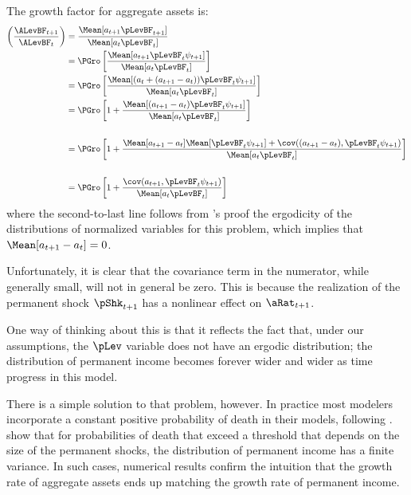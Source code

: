 \documentclass[./BufferStockTheory.tex]{subfiles}
\begin{document}
{The growth factor for aggregate assets is:
\begin{align*}
\left(\frac{\ALevBF_{t+1}}{\ALevBF_{t}}\right)  & = \frac{\Mean[a_{t+1} \pLevBF_{t+1}]}{\Mean[a_{t} \pLevBF_{t}]}   \\ 
                                                & = \PGro \left[\frac{\Mean[a_{t+1}\pLevBF_{t}\psi_{t+1}]}{\Mean[a_{t}\pLevBF_{t}]}\right] \\
                                                & = \PGro \left[\frac{\Mean[(a_{t}+(a_{t+1}-a_{t}))\pLevBF_{t}\psi_{t+1}]}{\Mean[a_{t}\pLevBF_{t}]}\right] \\
  & = \PGro \left[1+\frac{\Mean[(a_{t+1}-a_{t})\pLevBF_{t}\psi_{t+1}]}{\Mean[a_{t}\pLevBF_{t}]}\right] \\  
  \\  & = \PGro \left[1+\frac{\Mean[a_{t+1}-a_{t}]\Mean[\pLevBF_{t}\psi_{t+1}]+\cov((a_{t+1}-a_{t}),\pLevBF_{t}\psi_{t+1})}{\Mean[a_{t}\pLevBF_{t}]}\right] \\
\\  & = \PGro \left[1+\frac{\cov(a_{t+1},\pLevBF_{t}\psi_{t+1})}{\Mean[a_{t}\pLevBF_{t}]}\right] \\    
\end{align*}
where the second-to-last line follows from \cite{szeidlInvariant}'s proof the ergodicity of the distributions of normalized
variables for this problem, which implies that $\Mean[a_{t+1}-a_{t}]=0$.

Unfortunately, it is clear that the covariance term in the numerator, while generally small, will not in general be zero.  This is because the realization of the permanent shock $\pShk_{t+1}$ has a nonlinear effect on $\aRat_{t+1}$.

One way of thinking about this is that it reflects the fact that, under our assumptions, the $\pLev$ variable does not have an ergodic distribution;
the distribution of permanent income becomes forever wider and wider as time progress in this model.

There is a simple solution to that problem, however. In practice most modelers incorporate a constant positive probability of death in their models, following \cite{blanchardFinite}.  \cite{cstwMPC} show that for probabilities of death that exceed a threshold that depends on the size of the permanent shocks, the distribution of permanent income has a finite variance.  In such cases, numerical results confirm the intuition that the growth rate of aggregate assets ends up matching the growth rate of permanent income.

}
\end{document}
